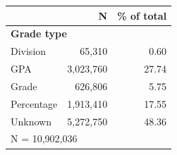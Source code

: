 \begin{tabular}{lrr}


\toprule


 & N & \% of total \\


\midrule


\multicolumn{3}{l}{\textbf{Grade type}}\\ 
\midrule
Division            &      65,310&        0.60\\
GPA                 &   3,023,760&       27.74\\
Grade               &     626,806&        5.75\\
Percentage          &   1,913,410&       17.55\\
Unknown             &   5,272,750&       48.36\\
\midrule


\multicolumn{3}{l}{\footnotesize N =   10,902,036}\\


\bottomrule


\end{tabular}


